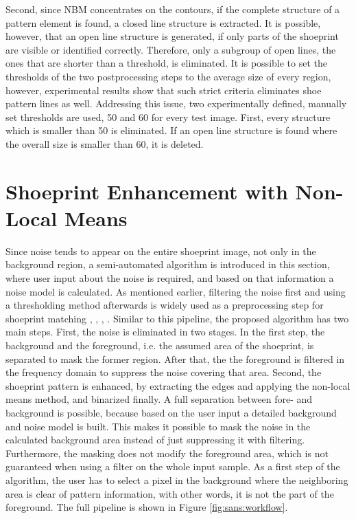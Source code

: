 \documentclass[draft,final]{vutinfth} %
\begin{document}
Second, since NBM concentrates on the contours, if the complete structure of a pattern element is found, a closed line structure is extracted.
It is possible, however, that an open line structure is generated, if only parts of the shoeprint are visible or identified correctly.
Therefore, only a subgroup of open lines, the ones that are shorter than a threshold, is eliminated.
It is possible to set the thresholds of the two postprocessing steps to the average size of every region, however, experimental results show that such strict criteria eliminates shoe pattern lines as well.
Addressing this issue, two experimentally defined, manually set thresholds are used, 50 and 60 for every test image.
First, every structure which is smaller than 50 is eliminated.
If an open line structure is found where the overall size is smaller than 60, it is deleted. 

\section{Shoeprint Enhancement with Non-Local Means}
\par
Since noise tends to appear on the entire shoeprint image, not only in the background region, a semi-automated algorithm is introduced in this section, where user input about the noise is required, and based on that information a noise model is calculated.
As mentioned earlier, filtering the noise first and using a thresholding method afterwards is widely used as a preprocessing step for shoeprint matching \cite{alizadeh2017automatic}, \cite{wang2014automatic}, \cite{li2014retrieval}, \cite{kong2014novel}.
Similar to this pipeline, the proposed algorithm has two main steps.
First, the noise is eliminated in two stages.
In the first step, the background and the foreground, i.e. the assumed area of the shoeprint, is separated to mask the former region.
After that, the the foreground is filtered in the frequency domain to suppress  the noise covering that area.
Second, the shoeprint pattern is enhanced, by extracting the edges and applying the non-local means method, and binarized finally.
A full separation between fore- and background is possible, because based on the user input a detailed background and noise model is built.
This makes it possible to mask the noise in the calculated background area instead of just suppressing it with filtering.
Furthermore, the masking does not modify the foreground area, which is not guaranteed when using a filter on the whole input sample.
As a first step of the algorithm, the user has to select a pixel in the background  where the neighboring area is clear of pattern information, with other words, it is not the part of the foreground. 
The full pipeline is shown in Figure \ref{fig:sans:workflow}.
\end{document}
